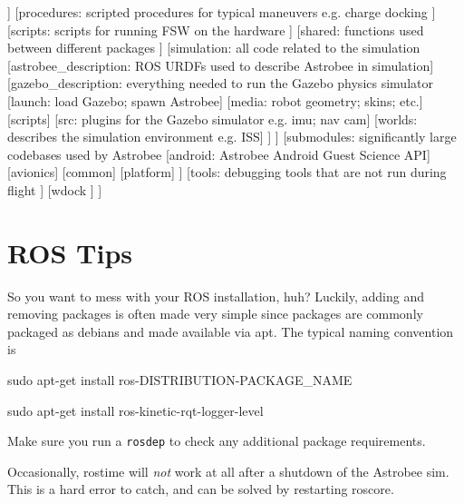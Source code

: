 \documentclass{article}
\begin{document}
\begin{adjustwidth}{-1in}{-1in}
\begin{forest}
	]
	[procedures: scripted procedures for typical maneuvers e.g. charge docking
	]
	[scripts: scripts for running FSW on the hardware
	]
	[shared: functions used between different packages
	]
	[simulation: all code related to the simulation
	[astrobee\_description: ROS URDFs used to describe Astrobee in simulation]
	[gazebo\_description: everything needed to run the Gazebo physics simulator
	[launch: load Gazebo; spawn Astrobee]
	[media: robot geometry; skins; etc.]
	[scripts]
	[src: plugins for the Gazebo simulator e.g. imu; nav cam]
	[worlds: describes the simulation environment e.g. ISS]
	]
	]
	[submodules: significantly large codebases used by Astrobee
	[android: Astrobee Android Guest Science API]
	[avionics]
	[common]
	[platform]
	]
	[tools: debugging tools that are not run during flight
	]
	[wdock
	]
	]
\end{forest}
\end{adjustwidth}

\section{ROS Tips}
So you want to mess with your ROS installation, huh? Luckily, adding and removing packages is often made very simple since packages are commonly packaged as debians and made available via apt. The typical naming convention is \begin{markdown}
	sudo apt-get install ros-DISTRIBUTION-PACKAGE_NAME
	
	sudo apt-get install ros-kinetic-rqt-logger-level
\end{markdown}
Make sure you run a \texttt{rosdep} to check any additional package requirements.

Occasionally, rostime will \textit{not} work at all after a shutdown of the Astrobee sim. This is a hard error to catch, and can be solved by restarting roscore.
\end{document}
